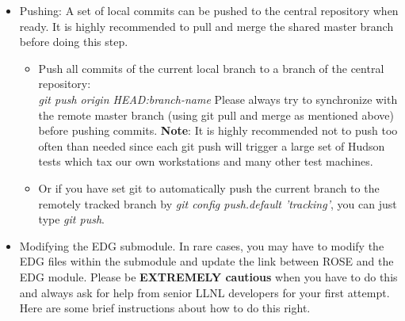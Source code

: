 \begin{itemize}
\item Pushing: A set of local commits can be pushed to the central repository when ready.
It is highly recommended to pull and merge the shared master branch before doing this step.
   \begin{itemize}
          \item Push all commits of the current local branch to a branch of the central repository:\\ \textit{git push origin HEAD:branch-name}
 Please always try to synchronize with the
          remote master branch (using git pull and merge as mentioned
          above) before pushing commits. \textbf{Note}: It is highly recommended not to push too often than
          needed since each git push will trigger a large set of
          Hudson tests which tax our own workstations and many other test machines.

          \item Or if you have set git to automatically push the current branch to the remotely tracked branch by  \textit{git config push.default 'tracking'},
      you can just type \textit{git push}. 

   \end{itemize}

\item Modifying the EDG submodule. In rare cases, you may have to modify the EDG files within the submodule and update the link between ROSE and the EDG module. Please be {\bf EXTREMELY cautious} when you have to do this and always
ask for help from senior LLNL developers for your first attempt. Here are some brief instructions about how to do this right.
     \begin{itemize}


\end{itemize}
\end{itemize}
